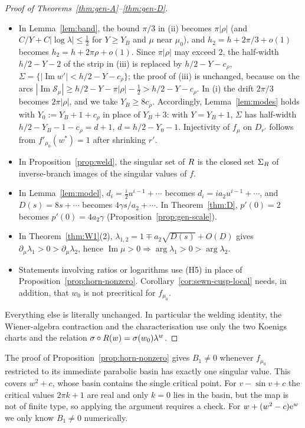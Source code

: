 \begin{proof}[Proof of Theorems~\ref{thm:gen-A}--\ref{thm:gen-D}]
\begin{itemize}
  (Lemma~\ref{lem:gen-real}).
\item In Lemma~\ref{lem:band}, the bound $\pi/3$ in (ii) becomes $\pi|\rho|$
  (and $C/Y+C|\log\lambda|\le\tfrac12$ for $Y\ge Y_B$ and $\mu$ near $\mu_0$), and
  $h_2=h+2\pi/3+o(1)$ becomes $h_2=h+2\pi\rho+o(1)$.  Since $\pi|\rho|$ may exceed
  $2$, the half-width $h/2-Y-2$ of the strip in (iii) is replaced by
  $h/2-Y-c_\rho$, $\Sigma=\{|\operatorname{Im}w'|<h/2-Y-c_\rho\}$; the proof of
  (iii) is unchanged, because on the arcs
  $|\operatorname{Im}\mathcal S_\mu|\ge h/2-Y-\pi|\rho|-\tfrac12>h/2-Y-c_\rho$.  In
  (i) the drift $2\pi/3$ becomes $2\pi|\rho|$, and we take $Y_B\ge8c_\rho$.
  Accordingly, Lemma~\ref{lem:modes} holds with $Y_0:=Y_B+1+c_\rho$ in place of
  $Y_B+3$: with $Y=Y_B+1$, $\Sigma$ has half-width $h/2-Y_B-1-c_\rho=d+1$,
  $d=h/2-Y_0-1$.  Injectivity of $f_\mu$ on
  $D_{r'}$ follows from $f'_{\mu_0}(w^*)=1$ after shrinking $r'$.
\item In Proposition~\ref{prop:weld}, the singular set of $R$ is the closed
  set $\Sigma_R$ of inverse-branch images of the singular values of $f$.
\item In Lemma~\ref{lem:model}, $d_i=\tfrac i2u^{i-1}+\cdots$ becomes
  $d_i=ia_2u^{i-1}+\cdots$, and $D(s)=8s+\cdots$ becomes $4\gamma s/a_2+\cdots$.
  In Theorem~\ref{thm:D}, $p'(0)=2$ becomes $p'(0)=4a_2\gamma$
  (Proposition~\ref{prop:gen-scale}).
\item In Theorem~\ref{thm:W1}(2), $\lambda_{1,2}=1\mp a_2\sqrt{D(s)}+O(D)$ gives
  $\partial_\mu\lambda_1>0>\partial_\mu\lambda_2$, hence
  $\operatorname{Im}\mu>0\Rightarrow\arg\lambda_1>0>\arg\lambda_2$.
\item Statements involving ratios or logarithms use \textup{(H5)} in place of
  Proposition~\ref{prop:horn-nonzero}.  Corollary~\ref{cor:sewn-cusp-local}
  needs, in addition, that $w_0$ is not precritical for $f_{\mu_0}$.
\end{itemize}
Everything else is literally unchanged.  In particular the welding identity,
the Wiener-algebra contraction and the characterisation use only the two
Koenigs charts and the relation $\sigma\circ R(w)=\sigma(w_0)\lambda^w$.
\end{proof}

\begin{remark}[On \textup{(H5)}]\label{rem:gen-B1}
The proof of Proposition~\ref{prop:horn-nonzero} gives $B_1\ne0$ whenever
$f_{\mu_0}$ restricted to its immediate parabolic basin has exactly one singular
value.  This covers $w^2+c$, whose basin contains the single critical point.
For $v-\sin v+c$ the critical values $2\pi k+1$ are real and only $k=0$ lies in
the basin, but the map is not of finite type, so applying the argument requires
a check.  For $w+(w^2-c)\mathrm{e}^w$ we only know $B_1\ne0$ numerically.
\end{remark}

